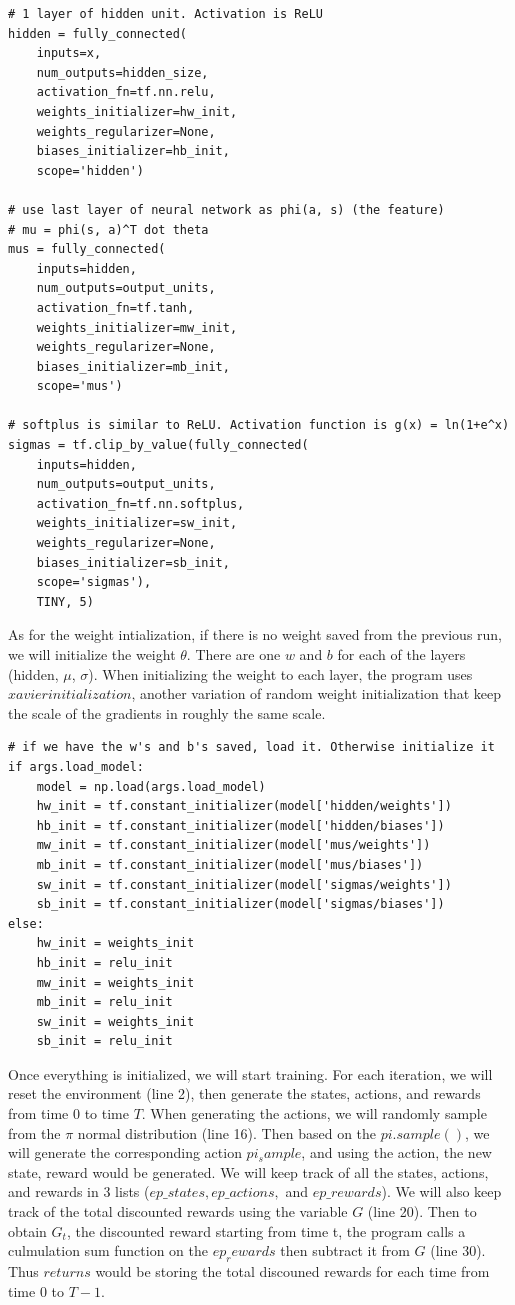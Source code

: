 \documentclass[11pt,twoside]{article}
\begin{document}
\begin{lstlisting}
# 1 layer of hidden unit. Activation is ReLU
hidden = fully_connected(
    inputs=x,
    num_outputs=hidden_size,
    activation_fn=tf.nn.relu,
    weights_initializer=hw_init,
    weights_regularizer=None,
    biases_initializer=hb_init,
    scope='hidden')

# use last layer of neural network as phi(a, s) (the feature)
# mu = phi(s, a)^T dot theta
mus = fully_connected(
    inputs=hidden,
    num_outputs=output_units,
    activation_fn=tf.tanh,
    weights_initializer=mw_init,
    weights_regularizer=None,
    biases_initializer=mb_init,
    scope='mus')

# softplus is similar to ReLU. Activation function is g(x) = ln(1+e^x)
sigmas = tf.clip_by_value(fully_connected(
    inputs=hidden,
    num_outputs=output_units,
    activation_fn=tf.nn.softplus,
    weights_initializer=sw_init,
    weights_regularizer=None,
    biases_initializer=sb_init,
    scope='sigmas'),
    TINY, 5)
\end{lstlisting}

As for the weight intialization, if there is no weight saved from the previous run, we will initialize the weight $\theta$. There are one $w$ and $b$ for each of the layers (hidden, $\mu$, $\sigma$). When initializing the weight to each layer, the program uses $xavier initialization$, another variation of random weight initialization that keep the scale of the gradients in roughly the same scale.

\begin{lstlisting}
# if we have the w's and b's saved, load it. Otherwise initialize it
if args.load_model:
    model = np.load(args.load_model)
    hw_init = tf.constant_initializer(model['hidden/weights'])
    hb_init = tf.constant_initializer(model['hidden/biases'])
    mw_init = tf.constant_initializer(model['mus/weights'])
    mb_init = tf.constant_initializer(model['mus/biases'])
    sw_init = tf.constant_initializer(model['sigmas/weights'])
    sb_init = tf.constant_initializer(model['sigmas/biases'])
else:
    hw_init = weights_init
    hb_init = relu_init
    mw_init = weights_init
    mb_init = relu_init
    sw_init = weights_init
    sb_init = relu_init
\end{lstlisting}

Once everything is initialized, we will start training. For each iteration, we will reset the environment (line 2), then generate the states, actions, and rewards from time 0 to time $T$. When generating the actions, we will randomly sample from the $\pi$ normal distribution (line 16). Then based on the $pi.sample()$, we will generate the corresponding action $pi_sample$, and using the action, the new state, reward would be generated. We will keep track of all the states, actions, and rewards in 3 lists ($ep\_states, ep\_actions, $ and $ep\_rewards$). We will also keep track of the total discounted rewards using the variable $G$ (line 20). Then to obtain $G_t$, the discounted reward starting from time t, the program calls a culmulation sum function on the $ep_rewards$ then subtract it from $G$ (line 30). Thus $returns$ would be storing the total discouned rewards for each time from time 0 to $T-1$.
\end{document}
